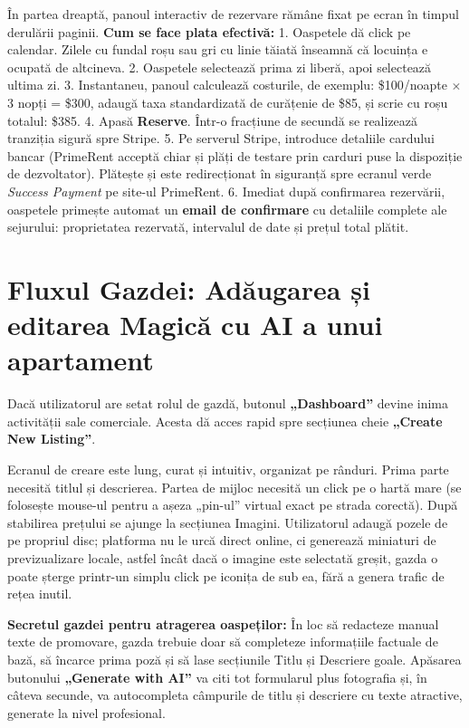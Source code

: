\documentclass[12pt,a4paper,oneside]{report}
\begin{document}
În partea dreaptă, panoul interactiv de rezervare rămâne fixat pe ecran în timpul derulării paginii.
\textbf{Cum se face plata efectivă:}
1. Oaspetele dă click pe calendar. Zilele cu fundal roșu sau gri cu linie tăiată înseamnă că locuința e ocupată de altcineva.
2. Oaspetele selectează prima zi liberă, apoi selectează ultima zi. 
3. Instantaneu, panoul calculează costurile, de exemplu: \$100/noapte $\times$ 3 nopți = \$300, adaugă taxa standardizată de curățenie de \$85, și scrie cu roșu totalul: \$385.
4. Apasă \textbf{Reserve}. Într-o fracțiune de secundă se realizează tranziția sigură spre Stripe. 
5. Pe serverul Stripe, introduce detaliile cardului bancar (PrimeRent acceptă chiar și plăți de testare prin carduri puse la dispoziție de dezvoltator). Plătește și este redirecționat în siguranță spre ecranul verde \textit{Success Payment} pe site-ul PrimeRent.
6. Imediat după confirmarea rezervării, oaspetele primește automat un \textbf{email de confirmare} cu detaliile complete ale sejurului: proprietatea rezervată, intervalul de date și prețul total plătit.

\section{Fluxul Gazdei: Adăugarea și editarea Magică cu AI a unui apartament}

Dacă utilizatorul are setat rolul de gazdă, butonul \textbf{„Dashboard''} devine inima activității sale comerciale. Acesta dă acces rapid spre secțiunea cheie \textbf{„Create New Listing''}.

Ecranul de creare este lung, curat și intuitiv, organizat pe rânduri. Prima parte necesită titlul și descrierea. Partea de mijloc necesită un click pe o hartă mare (se folosește mouse-ul pentru a așeza „pin-ul'' virtual exact pe strada corectă). După stabilirea prețului se ajunge la secțiunea Imagini.
Utilizatorul adaugă pozele de pe propriul disc; platforma nu le urcă direct online, ci generează miniaturi de previzualizare locale, astfel încât dacă o imagine este selectată greșit, gazda o poate șterge printr-un simplu click pe iconița de sub ea, fără a genera trafic de rețea inutil.

\textbf{Secretul gazdei pentru atragerea oaspeților:} În loc să redacteze manual texte de promovare, gazda trebuie doar să completeze informațiile factuale de bază, să încarce prima poză și să lase secțiunile Titlu și Descriere goale. Apăsarea butonului \textbf{„Generate with AI''} va citi tot formularul plus fotografia și, în câteva secunde, va autocompleta câmpurile de titlu și descriere cu texte atractive, generate la nivel profesional. 
\end{document}
